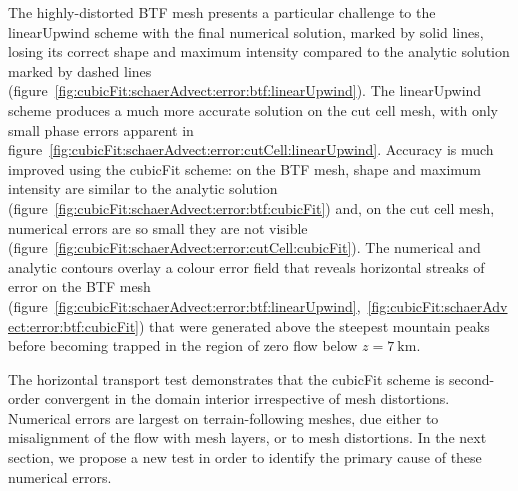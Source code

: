 The highly-distorted BTF mesh presents a particular challenge to the linearUpwind scheme with the final numerical solution, marked by solid lines, losing its correct shape and maximum intensity compared to the analytic solution marked by dashed lines (figure~\ref{fig:cubicFit:schaerAdvect:error:btf:linearUpwind}).
The linearUpwind scheme produces a much more accurate solution on the cut cell mesh, with only small phase errors apparent in figure~\ref{fig:cubicFit:schaerAdvect:error:cutCell:linearUpwind}.
Accuracy is much improved using the cubicFit scheme: on the BTF mesh, shape and maximum intensity are similar to the analytic solution (figure~\ref{fig:cubicFit:schaerAdvect:error:btf:cubicFit}) and, on the cut cell mesh, numerical errors are so small they are not visible (figure~\ref{fig:cubicFit:schaerAdvect:error:cutCell:cubicFit}).
The numerical and analytic contours overlay a colour error field that reveals horizontal streaks of error on the BTF mesh (figure~\ref{fig:cubicFit:schaerAdvect:error:btf:linearUpwind},~\ref{fig:cubicFit:schaerAdvect:error:btf:cubicFit}) that were generated above the steepest mountain peaks before becoming trapped in the region of zero flow below $z = \SI{7}{\kilo\meter}$.

The horizontal transport test demonstrates that the cubicFit scheme is second-order convergent in the domain interior irrespective of mesh distortions.  Numerical errors are largest on terrain-following meshes, due either to misalignment of the flow with mesh layers, or to mesh distortions.
In the next section, we propose a new test in order to identify the primary cause of these numerical errors.
